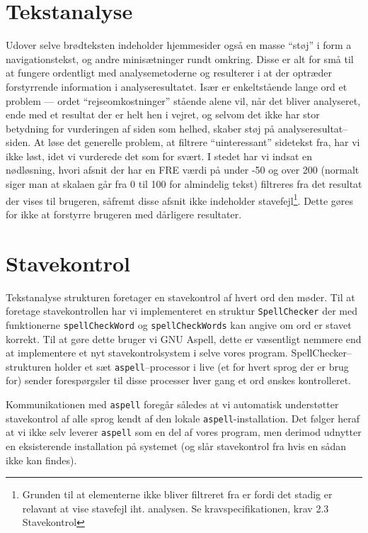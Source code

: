 \documentclass[a4paper,oneside]{memoir}
\begin{document}
\section{Tekstanalyse}
\label{Tekstanalyse}


Udover selve brødteksten indeholder hjemmesider også en masse ``støj''
i form a navigationstekst, og andre minisætninger rundt omkring. Disse
er alt for små til at fungere ordentligt med analysemetoderne og
resulterer i at der optræder forstyrrende information i
analyseresultatet. Især er enkeltstående lange ord et problem ---
ordet ``rejseomkostninger'' stående alene vil, når det bliver
analyseret, ende med et resultat der er helt hen i vejret, og selvom
det ikke har stor betydning for vurderingen af siden som helhed,
skaber støj på analyseresultat--siden. At løse det generelle problem,
at filtrere ``uinteressant'' sidetekst fra, har vi ikke løst, idet vi
vurderede det som for svært. I stedet har vi indsat en nødløsning,
hvori afsnit der har en FRE værdi på under -50 og over 200 (normalt
siger man at skalaen går fra 0 til 100 for almindelig tekst) filtreres
fra det resultat der vises til brugeren, såfremt disse afsnit ikke
indeholder stavefejl\footnote{Grunden til at elementerne ikke bliver
  filtreret fra er fordi det stadig er relavant at vise stavefejl
  iht. analysen. Se kravspecifikationen, krav 2.3 Stavekontrol}. Dette
gøres for ikke at forstyrre brugeren med dårligere resultater.

\section{Stavekontrol}
\label{spellchecker}

Tekstanalyse strukturen foretager en stavekontrol af hvert ord den
møder. Til at foretage stavekontrollen har vi implementeret en
struktur \texttt{SpellChecker} der med funktionerne
\texttt{spellCheckWord} og \texttt{spellCheckWords} kan angive om ord
er stavet korrekt. Til at gøre dette bruger vi GNU Aspell, dette er
væsentligt nemmere end at implementere et nyt stavekontrolsystem i selve
vores program. SpellChecker--strukturen holder et sæt
\texttt{aspell}--processor i live (et for hvert sprog der er brug for)
sender forespørgsler til disse processer hver gang et ord ønskes
kontrolleret.

Kommunikationen med \texttt{aspell} foregår således at
vi automatisk understøtter stavekontrol af alle sprog kendt af den
lokale \texttt{aspell}-installation. Det følger heraf at vi ikke selv
leverer \texttt{aspell} som en del af vores program, men derimod
udnytter en eksisterende installation på systemet (og slår
stavekontrol fra hvis en sådan ikke kan findes).
\end{document}
